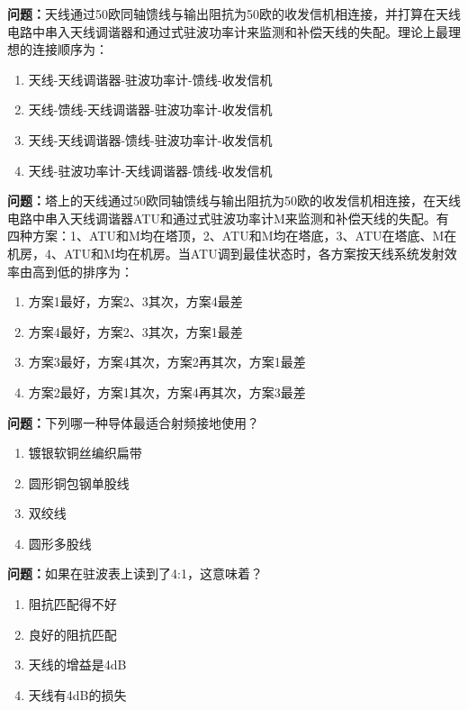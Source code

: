 \bigskip


\noindent\textbf{问题：}天线通过50欧同轴馈线与输出阻抗为50欧的收发信机相连接，并打算在天线电路中串入天线调谐器和通过式驻波功率计来监测和补偿天线的失配。理论上最理想的连接顺序为：
\begin{enumerate}[label=\Alph*), leftmargin=3em]
\item 天线-天线调谐器-驻波功率计-馈线-收发信机
\item 天线-馈线-天线调谐器-驻波功率计-收发信机
\item 天线-天线调谐器-馈线-驻波功率计-收发信机
\item 天线-驻波功率计-天线调谐器-馈线-收发信机
\end{enumerate}

\bigskip


\noindent\textbf{问题：}塔上的天线通过50欧同轴馈线与输出阻抗为50欧的收发信机相连接，在天线电路中串入天线调谐器ATU和通过式驻波功率计M来监测和补偿天线的失配。有四种方案：1、ATU和M均在塔顶，2、ATU和M均在塔底，3、ATU在塔底、M在机房，4、ATU和M均在机房。当ATU调到最佳状态时，各方案按天线系统发射效率由高到低的排序为：
\begin{enumerate}[label=\Alph*), leftmargin=3em]
\item 方案1最好，方案2、3其次，方案4最差
\item 方案4最好，方案2、3其次，方案1最差
\item 方案3最好，方案4其次，方案2再其次，方案1最差
\item 方案2最好，方案1其次，方案4再其次，方案3最差
\end{enumerate}

\bigskip


\noindent\textbf{问题：}下列哪一种导体最适合射频接地使用？
\begin{enumerate}[label=\Alph*), leftmargin=3em]
\item 镀银软铜丝编织扁带
\item 圆形铜包钢单股线
\item 双绞线
\item 圆形多股线
\end{enumerate}

\bigskip


\noindent\textbf{问题：}如果在驻波表上读到了4:1，这意味着？
\begin{enumerate}[label=\Alph*), leftmargin=3em]
\item 阻抗匹配得不好
\item 良好的阻抗匹配
\item 天线的增益是4dB
\item 天线有4dB的损失
\end{enumerate}

